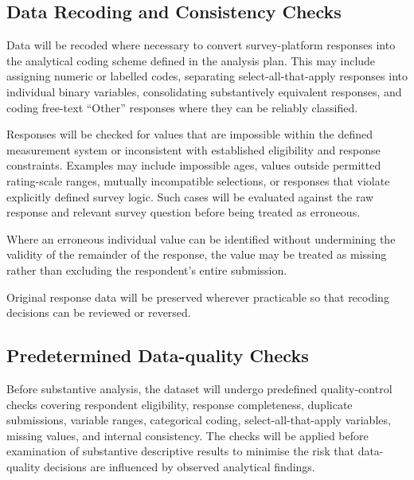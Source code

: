 \subsection{Data Recoding and Consistency Checks}

Data will be recoded where necessary to convert survey-platform responses into the analytical coding scheme defined in the analysis plan. This may include assigning numeric or labelled codes, separating select-all-that-apply responses into individual binary variables, consolidating substantively equivalent responses, and coding free-text ``Other'' responses where they can be reliably classified.

Responses will be checked for values that are impossible within the defined measurement system or inconsistent with established eligibility and response constraints. Examples may include impossible ages, values outside permitted rating-scale ranges, mutually incompatible selections, or responses that violate explicitly defined survey logic. Such cases will be evaluated against the raw response and relevant survey question before being treated as erroneous.

Where an erroneous individual value can be identified without undermining the validity of the remainder of the response, the value may be treated as missing rather than excluding the respondent's entire submission.

Original response data will be preserved wherever practicable so that recoding decisions can be reviewed or reversed.


\subsection{Predetermined Data-quality Checks}

Before substantive analysis, the dataset will undergo predefined quality-control checks covering respondent eligibility, response completeness, duplicate submissions, variable ranges, categorical coding, select-all-that-apply variables, missing values, and internal consistency. The checks will be applied before examination of substantive descriptive results to minimise the risk that data-quality decisions are influenced by observed analytical findings.

